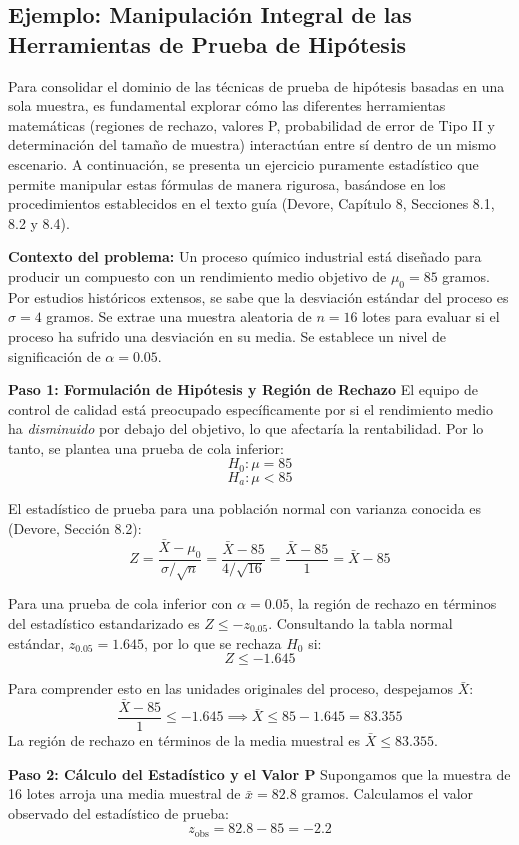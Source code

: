 \subsection{Ejemplo: Manipulación Integral de las Herramientas de Prueba de Hipótesis}

Para consolidar el dominio de las técnicas de prueba de hipótesis basadas en una sola muestra, es fundamental explorar cómo las diferentes herramientas matemáticas (regiones de rechazo, valores P, probabilidad de error de Tipo II y determinación del tamaño de muestra) interactúan entre sí dentro de un mismo escenario. A continuación, se presenta un ejercicio puramente estadístico que permite manipular estas fórmulas de manera rigurosa, basándose en los procedimientos establecidos en el texto guía (Devore, Capítulo 8, Secciones 8.1, 8.2 y 8.4).

\textbf{Contexto del problema:}
Un proceso químico industrial está diseñado para producir un compuesto con un rendimiento medio objetivo de $\mu_0 = 85$ gramos. Por estudios históricos extensos, se sabe que la desviación estándar del proceso es $\sigma = 4$ gramos. Se extrae una muestra aleatoria de $n = 16$ lotes para evaluar si el proceso ha sufrido una desviación en su media. Se establece un nivel de significación de $\alpha = 0.05$.

\textbf{Paso 1: Formulación de Hipótesis y Región de Rechazo}
El equipo de control de calidad está preocupado específicamente por si el rendimiento medio ha \textit{disminuido} por debajo del objetivo, lo que afectaría la rentabilidad. Por lo tanto, se plantea una prueba de cola inferior:
$$ H_0: \mu = 85 $$
$$ H_a: \mu < 85 $$

El estadístico de prueba para una población normal con varianza conocida es (Devore, Sección 8.2):
$$ Z = \frac{\bar{X} - \mu_0}{\sigma / \sqrt{n}} = \frac{\bar{X} - 85}{4 / \sqrt{16}} = \frac{\bar{X} - 85}{1} = \bar{X} - 85 $$

Para una prueba de cola inferior con $\alpha = 0.05$, la región de rechazo en términos del estadístico estandarizado es $Z \le -z_{0.05}$. Consultando la tabla normal estándar, $z_{0.05} = 1.645$, por lo que se rechaza $H_0$ si:
$$ Z \le -1.645 $$

Para comprender esto en las unidades originales del proceso, despejamos $\bar{X}$:
$$ \frac{\bar{X} - 85}{1} \le -1.645 \implies \bar{X} \le 85 - 1.645 = 83.355 $$
La región de rechazo en términos de la media muestral es $\bar{X} \le 83.355$.

\textbf{Paso 2: Cálculo del Estadístico y el Valor P}
Supongamos que la muestra de 16 lotes arroja una media muestral de $\bar{x} = 82.8$ gramos. 
Calculamos el valor observado del estadístico de prueba:
$$ z_{\text{obs}} = 82.8 - 85 = -2.2 $$

